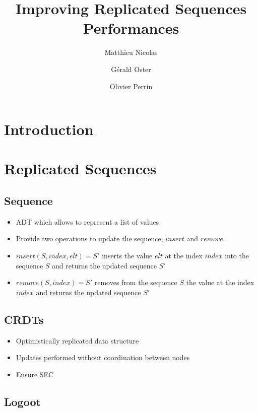 \documentclass{article}
\begin{document}
\title{Improving Replicated Sequences Performances}
\author{Matthieu Nicolas}
\author{Gérald Oster}
\author{Olivier Perrin}
\date{}

\maketitle

\section{Introduction}

\section{Replicated Sequences}

\subsection{Sequence}

\begin{itemize}
    \item \ac{ADT} which allows to represent a list of values
    \item Provide two operations to update the sequence, $insert$ and $remove$
    \item $insert(S, index, elt) = S'$ inserts the value $elt$ at the index $index$ into the sequence $S$ and returns the updated sequence $S'$
    \item $remove(S, index) = S'$ removes from the sequence $S$ the value at the index $index$ and returns the updated sequence $S'$
\end{itemize}

\subsection{\acp{CRDT} \cite{shapiro:inria-00555588, shapiro_2011_crdt}}

\begin{itemize}
    \item Optimistically replicated data structure
    \item Updates performed without coordination between nodes
    \item Ensure \ac{SEC} \cite{shapiro_2011_crdt}
\end{itemize}

\subsection{Logoot \cite{WeissICDCS09}}
\end{document}
